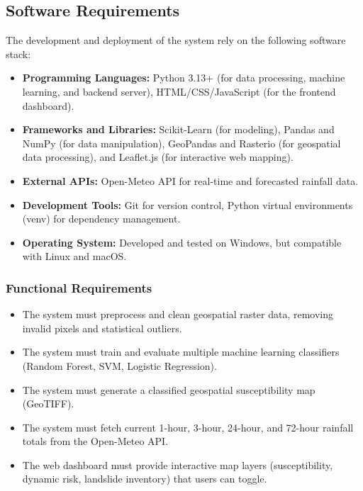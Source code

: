 \subsection{Software Requirements}
The development and deployment of the system rely on the following software stack:
\begin{itemize}
    \item \textbf{Programming Languages:} Python 3.13+ (for data processing, machine learning, and backend server), HTML/CSS/JavaScript (for the frontend dashboard).
    \item \textbf{Frameworks and Libraries:} Scikit-Learn (for modeling), Pandas and NumPy (for data manipulation), GeoPandas and Rasterio (for geospatial data processing), and Leaflet.js (for interactive web mapping).
    \item \textbf{External APIs:} Open-Meteo API for real-time and forecasted rainfall data.
    \item \textbf{Development Tools:} Git for version control, Python virtual environments (venv) for dependency management.
    \item \textbf{Operating System:} Developed and tested on Windows, but compatible with Linux and macOS.
\end{itemize}

\subsubsection{Functional Requirements}
\begin{itemize}
    \item The system must preprocess and clean geospatial raster data, removing invalid pixels and statistical outliers.
    \item The system must train and evaluate multiple machine learning classifiers (Random Forest, SVM, Logistic Regression).
    \item The system must generate a classified geospatial susceptibility map (GeoTIFF).
    \item The system must fetch current 1-hour, 3-hour, 24-hour, and 72-hour rainfall totals from the Open-Meteo API.
    \item The web dashboard must provide interactive map layers (susceptibility, dynamic risk, landslide inventory) that users can toggle.
\end{itemize}


